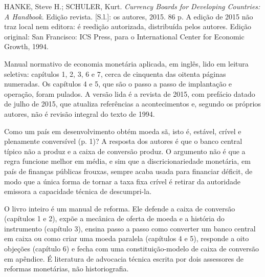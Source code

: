 
\begin{identificacao}
HANKE, Steve H.; SCHULER, Kurt. \emph{Currency Boards for Developing
Countries: A Handbook}. Edição revista. [S.l.]: os autores, 2015. 86 p. A edição de 2015 não
traz local nem editora: é reedição autorizada, distribuída pelos autores.
Edição original: San Francisco: ICS Press, para o International Center for
Economic Growth, 1994.

Manual normativo de economia monetária aplicada, em inglês, lido em leitura
seletiva: capítulos 1, 2, 3, 6 e 7, cerca de cinquenta das oitenta páginas
numeradas. Os capítulos 4 e 5, que são o passo a passo de implantação e
operação, foram pulados. A versão lida é a revista de 2015, com prefácio
datado de julho de 2015, que atualiza referências a acontecimentos e,
segundo os próprios autores, não é revisão integral do texto de 1994.
\end{identificacao}

Como um país em desenvolvimento obtém moeda sã, isto é, estável, crível e
plenamente conversível (p. 1)? A resposta dos autores é que o banco central
típico não a produz e a caixa de conversão produz. O argumento não é que a
regra funcione melhor em média, e sim que a discricionariedade monetária, em
país de finanças públicas frouxas, sempre acaba usada para financiar déficit,
de modo que a única forma de tornar a taxa fixa crível é retirar da autoridade
emissora a capacidade técnica de descumpri-la.

O livro inteiro é um manual de reforma. Ele defende a caixa de conversão
(capítulos 1 e 2), expõe a mecânica de oferta de moeda e a história do
instrumento (capítulo 3), ensina passo a passo como converter um banco central
em caixa ou como criar uma moeda paralela (capítulos 4 e 5), responde a oito
objeções (capítulo 6) e fecha com uma constituição-modelo de caixa de conversão
em apêndice. É literatura de advocacia técnica escrita por dois assessores de
reformas monetárias, não historiografia.


